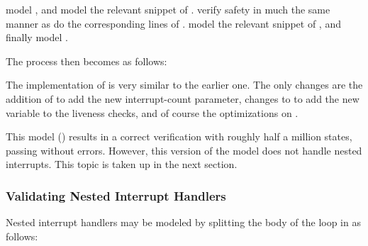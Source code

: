 \begin{fcvref}
 model , and
 model the relevant snippet
of .
 verify safety in much the same manner
as do the corresponding lines of .
 model the relevant snippet of ,
and finally  model .
\end{fcvref}

\QuickQuizEnd

The  process then becomes as follows:



\begin{fcvref}
The implementation of  is very similar
to the earlier one.
The only changes are the addition of  to add the new
interrupt-count parameter, changes to
 to add the new  variable
to the liveness checks, and of course the optimizations on .
\end{fcvref}

This model ()
results in a correct verification with roughly half a million
states, passing without errors.
However, this version of the model does not handle nested
interrupts.
This topic is taken up in the next section.

\subsubsection{Validating Nested Interrupt Handlers}
\label{sec:formal:Validating Nested Interrupt Handlers}

Nested interrupt handlers may be modeled by splitting the body of
the loop in  as follows:



